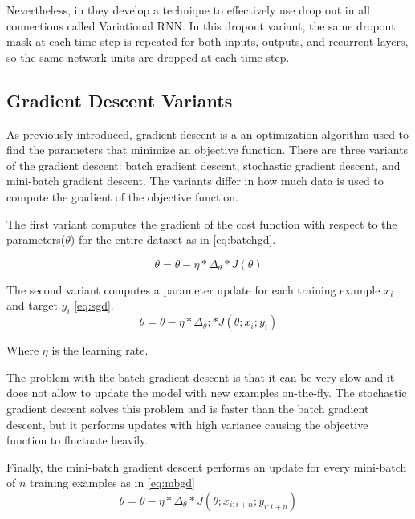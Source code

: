 Nevertheless, in \cite{gal2015theoretically} they develop a technique to effectively use drop out in all connections called Variational RNN. In this dropout variant, the same dropout mask at each time step is repeated for both inputs, outputs, and recurrent layers, so the same network units are dropped at each time step. 

\subsection{Gradient Descent Variants}
As previously introduced, gradient descent is a an optimization algorithm used to find the parameters that minimize an objective function. There are three variants of the gradient descent: batch gradient descent, stochastic gradient descent, and mini-batch gradient descent. The variants differ in how much data is used to compute the gradient of the objective function. 

The first variant computes the gradient of the cost function with respect to the parameters($\theta$) for the entire dataset as in \ref{eq:batchgd}.

\begin{equation} \label{eq:batchgd}
\theta=\theta-\eta * \Delta_\theta * J(\theta)
\end{equation}

The second variant computes a parameter update for each training example $x_i$ and target $y_i$ \ref{eq:sgd}.
\begin{equation} \label{eq:sgd}
\theta=\theta-\eta * \Delta_\theta; * J(\theta;x_i;y_i)
\end{equation}

Where $\eta$ is the learning rate.

The problem with the batch gradient descent is that it can be very slow and it does not allow to update the model with new examples on-the-fly. The stochastic gradient descent solves this problem and is faster than the batch gradient descent, but it performs updates with high variance causing the objective function to fluctuate heavily.  

Finally, the mini-batch gradient descent performs an update for every mini-batch of $n$ training examples as in \ref{eq:mbgd} \begin{equation} \label{eq:mbgd}
\theta=\theta-\eta * \Delta_\theta * J(\theta;x_{i:i+n};y_{i:i+n})
\end{equation}

